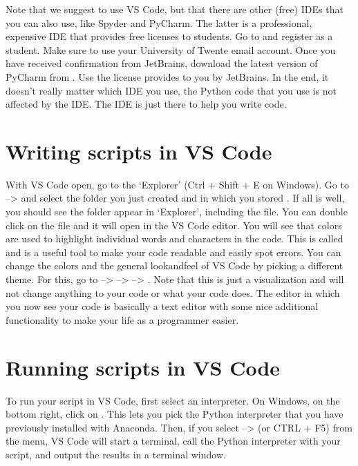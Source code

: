 \documentclass[letterpaper,10pt,english]{jupyterBook}
\begin{document}
\sphinxAtStartPar
Note that we suggest to use VS Code, but that there are other (free) IDEs that you can also use, like Spyder and PyCharm. The latter is a professional, expensive IDE that provides free licenses to students. Go to  and register as a student. Make sure to use  your University of Twente email account. Once you have received confirmation from JetBrains, download the latest version of PyCharm from . Use the license provides to you by JetBrains. In the end, it doesn’t really matter which IDE you use, the Python code that you use is not affected by the IDE. The IDE is just there to help you write code.


\section{Writing scripts in VS Code}
\label{\detokenize{notebooks/01_GettingStarted/01_GettingStarted_student:writing-scripts-in-vs-code}}
\sphinxAtStartPar
With VS Code open, go to the ‘Explorer’ (Ctrl + Shift + E on Windows). Go to  –>  and select the folder you just created and in which you stored . If all is well, you should see the folder appear in ‘Explorer’, including the  file. You can double click on the  file and it will open in the VS Code editor. You will see that colors are used to highlight individual words and characters in the code. This is called  and is a useful tool to make your code readable and easily spot errors. You can change the colors and the general look\sphinxhyphen{}and\sphinxhyphen{}feel of VS Code by picking a different theme. For this, go to  –>  –>  –> . Note that this is just a visualization and will not change anything to your code or what your code does. The editor in which you now see your code is basically a text editor with some nice additional functionality to make your life as a programmer easier.


\section{Running scripts in VS Code}
\label{\detokenize{notebooks/01_GettingStarted/01_GettingStarted_student:running-scripts-in-vs-code}}
\sphinxAtStartPar
To run your script in VS Code, first select an interpreter. On Windows, on the bottom right, click on . This lets you pick the Python interpreter that you have previously installed with Anaconda. Then, if you select  –>  (or CTRL + F5) from the menu, VS Code will start a terminal, call the Python interpreter with your script, and output the results in a terminal window.
\end{document}
